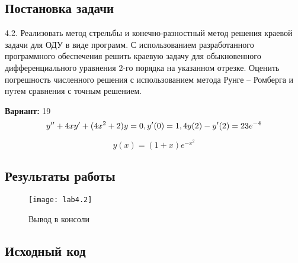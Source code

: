 \subsection{Постановка задачи}
4.2. Реализовать метод стрельбы и конечно-разностный метод решения краевой задачи для ОДУ в виде программ. С использованием разработанного программного обеспечения решить краевую задачу для обыкновенного дифференциального уравнения 2-го порядка на указанном отрезке. Оценить погрешность численного решения с использованием метода Рунге – Ромберга и путем сравнения с точным решением. 

{\bfseries Вариант:} 19
    \begin{equation}
		y'' + 4xy' +(4x^2 + 2)y = 0,\\
		y'(0)=1,\\
		4y(2)-y'(2)=23e^{-4}
    \end{equation}
    
    \begin{equation}
		y(x) = (1+x)e^{-x^2}
    \end{equation}
\pagebreak

\subsection{Результаты работы}
\begin{figure}[h!]
\centering
\texttt{[image: lab4.2]}
\caption{Вывод в консоли}
\end{figure}


\subsection{Исходный код}

\pagebreak

